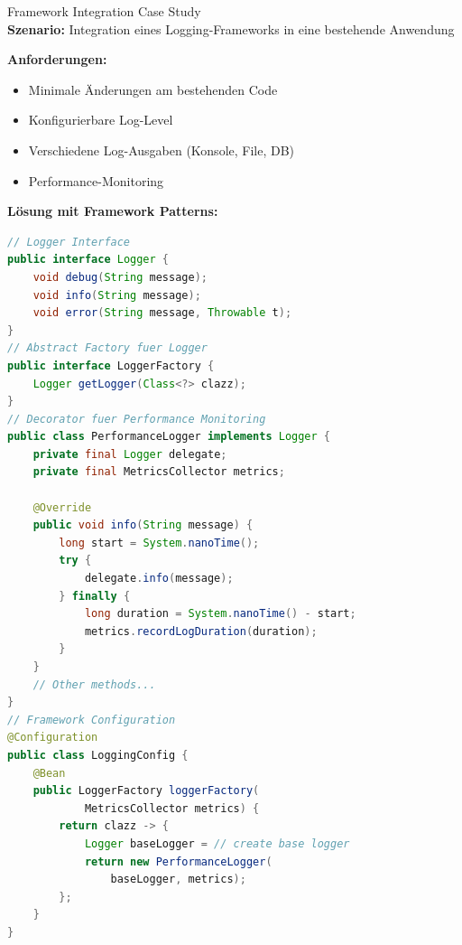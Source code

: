 \begin{example2}{Framework Integration Case Study}\\
\textbf{Szenario:}
Integration eines Logging-Frameworks in eine bestehende Anwendung

\textbf{Anforderungen:}
\begin{itemize}
    \item Minimale Änderungen am bestehenden Code
    \item Konfigurierbare Log-Level
    \item Verschiedene Log-Ausgaben (Konsole, File, DB)
    \item Performance-Monitoring
\end{itemize}

\textbf{Lösung mit Framework Patterns:}
\begin{lstlisting}[language=Java, style=basesmol]
// Logger Interface
public interface Logger {
    void debug(String message);
    void info(String message);
    void error(String message, Throwable t);
}
// Abstract Factory fuer Logger
public interface LoggerFactory {
    Logger getLogger(Class<?> clazz);
}
// Decorator fuer Performance Monitoring
public class PerformanceLogger implements Logger {
    private final Logger delegate;
    private final MetricsCollector metrics;
    
    @Override
    public void info(String message) {
        long start = System.nanoTime();
        try {
            delegate.info(message);
        } finally {
            long duration = System.nanoTime() - start;
            metrics.recordLogDuration(duration);
        }
    }
    // Other methods...
}
// Framework Configuration
@Configuration
public class LoggingConfig {
    @Bean
    public LoggerFactory loggerFactory(
            MetricsCollector metrics) {
        return clazz -> {
            Logger baseLogger = // create base logger
            return new PerformanceLogger(
                baseLogger, metrics);
        };
    }
}
\end{lstlisting}
\end{example2}



